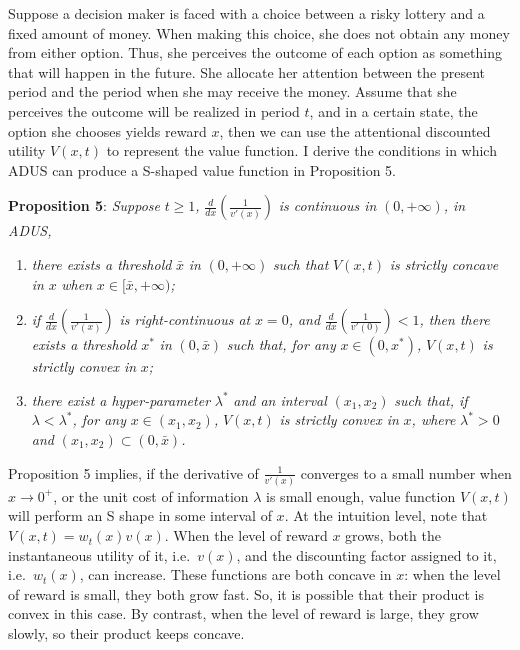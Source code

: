 \documentclass[
  12pt,
]{article}
\begin{document}
Suppose a decision maker is faced with a choice between a risky lottery
and a fixed amount of money. When making this choice, she does not
obtain any money from either option. Thus, she perceives the outcome of
each option as something that will happen in the future. She allocate
her attention between the present period and the period when she may
receive the money. Assume that she perceives the outcome will be
realized in period \(t\), and in a certain state, the option she chooses
yields reward \(x\), then we can use the attentional discounted utility
\(V(x,t)\) to represent the value function. I derive the conditions in
which ADUS can produce a S-shaped value function in Proposition 5.

\textbf{Proposition 5}: \emph{Suppose} \(t\geq1\)\emph{,}
\(\frac{d}{dx}\left(\frac{1}{v'(x)}\right)\) \emph{is continuous in}
\((0,+\infty)\)\emph{, in ADUS,}

\begin{enumerate}
\def\labelenumi{\arabic{enumi})}
\item
  \emph{there exists a threshold} \(\bar{x}\) \emph{in} \((0,+\infty)\)
  \emph{such that} \(V(x,t)\) \emph{is strictly concave in} \(x\)
  \emph{when} \(x\in [\bar{x},+\infty)\)\emph{;}
\item
  \emph{if} \(\frac{d}{dx}\left(\frac{1}{v'(x)}\right)\) \emph{is
  right-continuous at} \(x=0\)\emph{, and}
  \(\frac{d}{dx}\left(\frac{1}{v'(0)}\right)<1\)\emph{, then there
  exists a threshold} \(x^*\) \emph{in} \((0, \bar{x})\) \emph{such
  that, for any} \(x\in (0,x^*)\)\emph{,} \(V(x,t)\) \emph{is strictly
  convex in} \(x\)\emph{;}
\item
  \emph{there exist a hyper-parameter} \(\lambda^*\) \emph{and an
  interval} \((x_1,x_2)\) \emph{such that, if}
  \(\lambda<\lambda^*\)\emph{, for any} \(x\in(x_1,x_2)\)\emph{,}
  \(V(x,t)\) \emph{is strictly convex in} \(x\)\emph{, where}
  \(\lambda^*>0\) \emph{and} \((x_1,x_2)\subset(0,\bar{x})\)\emph{.}
\end{enumerate}

Proposition 5 implies, if the derivative of \(\frac{1}{v'(x)}\)
converges to a small number when \(x\rightarrow 0^+\), or the unit cost
of information \(\lambda\) is small enough, value function \(V(x,t)\)
will perform an S shape in some interval of \(x\). At the intuition
level, note that \(V(x,t)=w_t(x)v(x)\). When the level of reward \(x\)
grows, both the instantaneous utility of it, i.e.~\(v(x)\), and the
discounting factor assigned to it, i.e.~\(w_t(x)\), can increase. These
functions are both concave in \(x\): when the level of reward is small,
they both grow fast. So, it is possible that their product is convex in
this case. By contrast, when the level of reward is large, they grow
slowly, so their product keeps concave.
\end{document}
